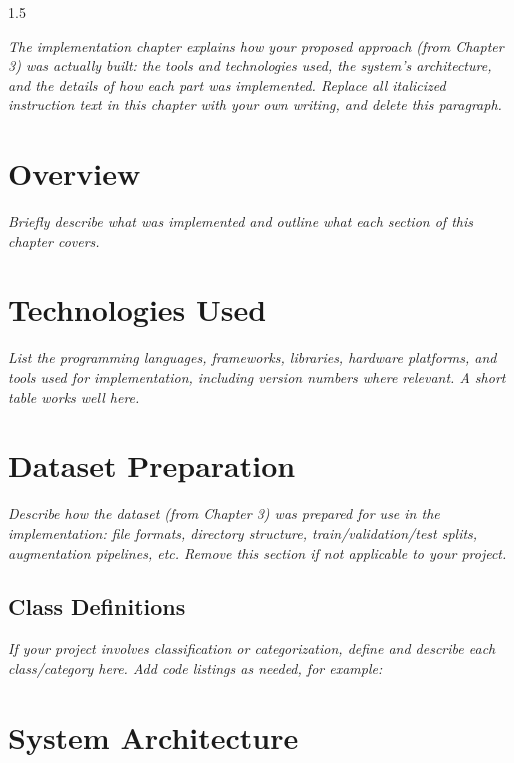 \begin{spacing}{1.5}
\vspace{1cm}

\textit{The implementation chapter explains how your proposed approach (from Chapter 3) was actually built: the tools and technologies used, the system's architecture, and the details of how each part was implemented. Replace all italicized instruction text in this chapter with your own writing, and delete this paragraph.}

\section{Overview}

\textit{Briefly describe what was implemented and outline what each section of this chapter covers.}

\section{Technologies Used}

\textit{List the programming languages, frameworks, libraries, hardware platforms, and tools used for implementation, including version numbers where relevant. A short table works well here.}

\section{Dataset Preparation}

\textit{Describe how the dataset (from Chapter 3) was prepared for use in the implementation: file formats, directory structure, train/validation/test splits, augmentation pipelines, etc. Remove this section if not applicable to your project.}

\subsection{Class Definitions}

\textit{If your project involves classification or categorization, define and describe each class/category here. Add code listings as needed, for example:}


\section{System Architecture}


\end{spacing}
